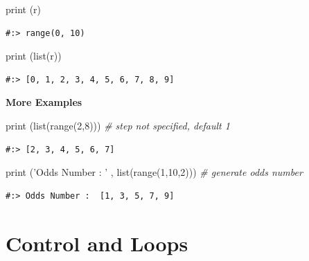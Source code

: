 \documentclass[
]{book}
\newenvironment{Shaded}{\begin{snugshade}}{\end{snugshade}}
\newcommand{\BuiltInTok}[1]{#1}
\newcommand{\CommentTok}[1]{\textcolor[rgb]{0.37,0.37,0.37}{\textit{#1}}}
\newcommand{\DecValTok}[1]{\textcolor[rgb]{0.06,0.06,0.06}{#1}}
\newcommand{\NormalTok}[1]{#1}
\newcommand{\StringTok}[1]{\textcolor[rgb]{0.5,0.5,0.5}{#1}}
\begin{document}
\begin{Shaded}
\begin{Highlighting}[]
\BuiltInTok{print}\NormalTok{ (r)}
\end{Highlighting}
\end{Shaded}

\begin{verbatim}
#:> range(0, 10)
\end{verbatim}

\begin{Shaded}
\begin{Highlighting}[]
\BuiltInTok{print}\NormalTok{ (}\BuiltInTok{list}\NormalTok{(r))}
\end{Highlighting}
\end{Shaded}

\begin{verbatim}
#:> [0, 1, 2, 3, 4, 5, 6, 7, 8, 9]
\end{verbatim}

\textbf{More Examples}

\begin{Shaded}
\begin{Highlighting}[]
\BuiltInTok{print}\NormalTok{ (}\BuiltInTok{list}\NormalTok{(}\BuiltInTok{range}\NormalTok{(}\DecValTok{2}\NormalTok{,}\DecValTok{8}\NormalTok{)))    }\CommentTok{# step not specified, default 1}
\end{Highlighting}
\end{Shaded}

\begin{verbatim}
#:> [2, 3, 4, 5, 6, 7]
\end{verbatim}

\begin{Shaded}
\begin{Highlighting}[]
\BuiltInTok{print}\NormalTok{ (}\StringTok{'Odds Number : '}\NormalTok{ , }\BuiltInTok{list}\NormalTok{(}\BuiltInTok{range}\NormalTok{(}\DecValTok{1}\NormalTok{,}\DecValTok{10}\NormalTok{,}\DecValTok{2}\NormalTok{))) }\CommentTok{# generate odds number}
\end{Highlighting}
\end{Shaded}

\begin{verbatim}
#:> Odds Number :  [1, 3, 5, 7, 9]
\end{verbatim}

\hypertarget{control-and-loops}{%
\chapter{Control and Loops}\label{control-and-loops}}
\end{document}
